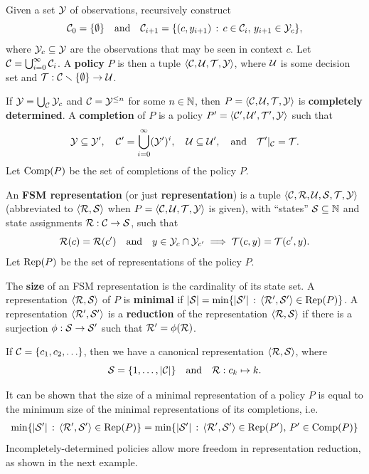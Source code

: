\begin{definition}[Policies]
Given a set $\Y$ of observations, recursively construct
\begin{equation}
\C_0 = \{\emptyset\}\qtx{and}\C_{i+1} = \{(c,y_{i+1})\,:\,c\in\C_i,\, y_{i+1}\in\Y_c\},
\end{equation}
where $\Y_c\subseteq\Y$ are the observations that may be seen in context $c$.  
Let $\C = \bigcup_{i=0}^{\infty}\C_i$.
A \textbf{policy} $P$ is then a tuple $\ang{\C, \U, \T, \Y}$, 
where $\U$ is some decision set and $\T:\C\andn\{\emptyset\}\to\U$.
\end{definition}
\begin{definition}
If $\Y=\bigcup_\C\Y_c$ and $\C=\Y^{\leq n}$ for some $n\in\NN$, then $P=\ang{\C,\U,\T,\Y}$ is \textbf{completely determined}.
A \textbf{completion} of $P$ is a policy $P\1=\ang{\C\1, \U\1, \T\1, \Y}$ such that
\begin{equation}
\Y\subseteq\Y\1,\quad \C\1=\bigcup_{i=0}^{\infty}(\Y\1)^i,\quad \U\subseteq\U\1, \qtx{and} \T\1|_{\C} = \T.
\end{equation}
Let $\Comp(P)$ be the set of completions of the policy $P$.
\end{definition}
\begin{definition}
An \textbf{FSM representation} (or just \textbf{representation})
is a tuple $\ang{\C,\R,\U,\S,\T,\Y}$ (abbreviated to $\ang{\R,\S}$ when $P=\ang{\C,\U,\T,\Y}$ is given), 
with ``states'' $\S\subseteq\NN$ and state assignments $\R:\C\to\S$, such that 
\begin{equation}
\R(c)=\R(c\1)\qtx{and}y\in\Y_c\cap\Y_{c\1}\implies\T(c,y)=\T(c\1,y).
\end{equation} 
Let $\Rep(P)$ be the set of representations of the policy $P$.  
\end{definition}
\begin{definition}
The \textbf{size} of an FSM representation is the cardinality of its state set.  
A representation $\ang{\R,\S}$ of $P$ is \textbf{minimal} if 
$|\S|=\min\{|\S\1|\,:\,\ang{\R\1,\S\1}\in\Rep(P)\}$.
A representation $\ang{\R\1,\S\1}$ is a \textbf{reduction} of the representation $\ang{\R,\S}$ if there is a surjection $\phi:\S\to\S\1$
such that $\R\1 = \phi(\R)$.
\end{definition}
\begin{example}
\label{ex:canon}
If $\C = \{c_1, c_2, \ldots\}$, then 
we have a canonical representation $\ang{\R,\S}$, where
\begin{equation}
\S=\{1,\ldots,|\C|\}\qtx{and}\R:c_k\mapsto k.
\end{equation} 
\end{example}
It can be shown that the size of a minimal representation of a policy $P$ is equal to the minimum
size of the minimal representations of its completions, i.e.
\begin{align}
\min\{|\S\1|\,:\,\ang{\R\1,\S\1}\in\Rep(P)\} = \min\{|\S\1|\,:\,\ang{\R\1,\S\1}\in\Rep(P\1),\,P\1\in\Comp(P)\}
\end{align}
Incompletely-determined policies allow more freedom in representation reduction, as shown in the next example.


